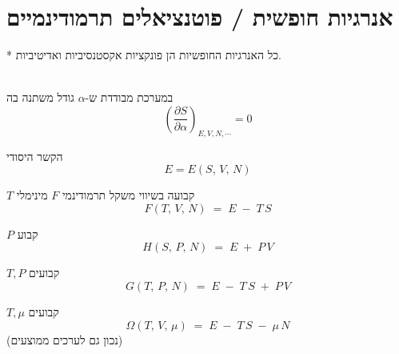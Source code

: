 \section{אנרגיות חופשית / פוטנציאלים תרמודינמיים}
* כל האנרגיות החופשיות הן פונקציות אקסטנסיביות ואדיטיביות.

\begin{cheatformula}\\
במערכת מבודדת ש-$\alpha$ גודל משתנה בה
$$\left( \frac{\partial S}{\partial \alpha} \right)_{E,V,N,\cdots} = 0$$
\end{cheatformula}

\begin{cheatformula}
הקשר היסודי
$$E = E(S,\,V,\,N)$$
\end{cheatformula}

\begin{cheatformula}
$T$ קבועה
בשיווי משקל תרמודינמי $F$ מינימלי
$$ F(T,\,V,\,N) \;=\; E \;-\; T\,S$$
\end{cheatformula}

\begin{cheatformula}[אנתלפיה]
$P$ קבוע
$$H(S,\,P,\,N) \;=\; E \;+\; P\,V$$
\end{cheatformula}

\begin{cheatformula}
$T,P$ קבועים
$$G(T,\,P,\,N) \;=\; E \;-\; T\,S \;+\; P\,V$$
\end{cheatformula}


\begin{cheatformula}
$T,\mu$ קבועים
$$\Omega(T,\,V,\,\mu) \;=\; E \;-\; T\,S \;-\; \mu\,N$$
(נכון גם לערכים ממוצעים)
\end{cheatformula}
